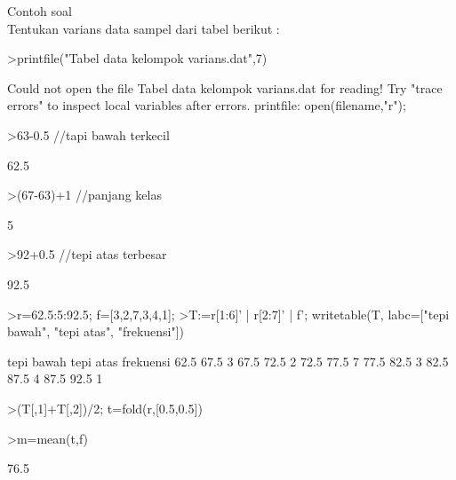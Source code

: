 \documentclass[a4paper,10pt]{article}
\begin{document}
\begin{eulernotebook}
\begin{eulercomment}
\begin{eulercomment}
\begin{eulercomment}
\begin{eulercomment}
\begin{eulercomment}
\begin{eulercomment}
\begin{eulercomment}
\begin{eulercomment}
\begin{eulercomment}
\begin{eulercomment}
\begin{eulercomment}
Contoh soal\\
Tentukan varians data sampel dari tabel berikut :
\end{eulercomment}
\begin{eulerprompt}
>printfile("Tabel data kelompok varians.dat",7) 
\end{eulerprompt}
\begin{euleroutput}
  Could not open the file
  Tabel data kelompok varians.dat
  for reading!
  Try "trace errors" to inspect local variables after errors.
  printfile:
      open(filename,"r");
\end{euleroutput}
\begin{eulerprompt}
>63-0.5  //tapi bawah terkecil
\end{eulerprompt}
\begin{euleroutput}
  62.5
\end{euleroutput}
\begin{eulerprompt}
>(67-63)+1  //panjang kelas
\end{eulerprompt}
\begin{euleroutput}
  5
\end{euleroutput}
\begin{eulerprompt}
>92+0.5  //tepi atas terbesar
\end{eulerprompt}
\begin{euleroutput}
  92.5
\end{euleroutput}
\begin{eulerprompt}
>r=62.5:5:92.5; f=[3,2,7,3,4,1];
>T:=r[1:6]' | r[2:7]' | f'; writetable(T, labc=["tepi bawah", "tepi atas", "frekuensi"])
\end{eulerprompt}
\begin{euleroutput}
   tepi bawah tepi atas frekuensi
         62.5      67.5         3
         67.5      72.5         2
         72.5      77.5         7
         77.5      82.5         3
         82.5      87.5         4
         87.5      92.5         1
\end{euleroutput}
\begin{eulerprompt}
>(T[,1]+T[,2])/2; t=fold(r,[0.5,0.5]) 
\end{eulerprompt}
\begin{euleroutput}
  [65,  70,  75,  80,  85,  90]
\end{euleroutput}
\begin{eulerprompt}
>m=mean(t,f)
\end{eulerprompt}
\begin{euleroutput}
  76.5
\end{euleroutput}
\begin{eulerprompt}

\end{eulerprompt}
\end{eulercomment}
\end{eulercomment}
\end{eulercomment}
\end{eulercomment}
\end{eulercomment}
\end{eulercomment}
\end{eulercomment}
\end{eulercomment}
\end{eulercomment}
\end{eulercomment}
\end{eulernotebook}
\end{document}

